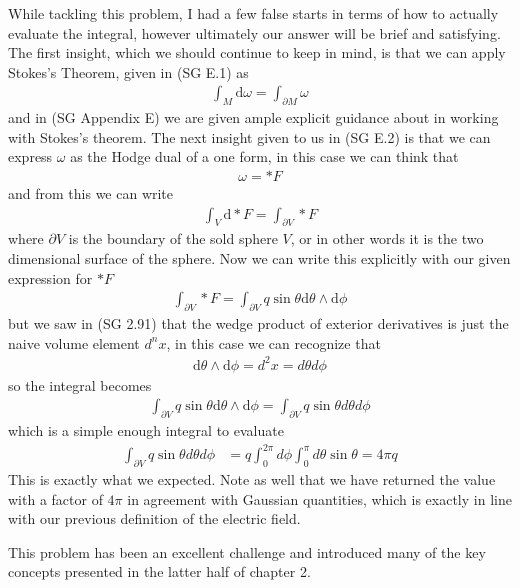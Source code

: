 While tackling this problem, I had a few false starts in terms of how to actually evaluate the integral, however ultimately our answer will be brief and satisfying. The first insight, which we should continue to keep in mind, is that we can apply Stokes's Theorem, given in (SG E.1) as 
%
\begin{align}
	\int_M \textrm{d} \omega = \int_{\partial M} \omega 
\end{align}
%
and in (SG Appendix E) we are given ample explicit guidance about in working with Stokes's theorem. The next insight given to us in (SG E.2) is that we can express $\omega$ as the Hodge dual of a one form, in this case we can think that
%
\begin{align}
	\omega = \ast F 
\end{align}
%
and from this we can write 
%
\begin{align}
	\int_V \textrm{d} \ast F = \int_{\partial V} \ast F
\end{align}
%
where $ \partial V $ is the boundary of the sold sphere $V$, or in other words it is the two dimensional surface of the sphere.  Now we can write this explicitly with our given expression for $ \ast F $
%
\begin{align}
	\int_{\partial V} \ast F = 	\int_{\partial V} q \sin{\theta} \textrm{d} \theta \wedge \textrm{d} \phi
\end{align}
%
but we saw in (SG 2.91) that the wedge product of exterior derivatives is just the naive volume element $d^n x$, in this case we can recognize that 
%
\begin{align}
	\textrm{d} \theta \wedge \textrm{d} \phi = d^2 x = d \theta d \phi
\end{align}
%
so the integral becomes
%
\begin{align}
	\int_{\partial V} q \sin{\theta} \textrm{d} \theta \wedge \textrm{d} \phi = \int_{\partial V} q \sin{\theta} d \theta d \phi
\end{align}
%
which is a simple enough integral to evaluate
%
\begin{align}
	\int_{\partial V} q \sin{\theta} d \theta d \phi &= q \int_{0}^{2 \pi} d \phi \int_{0}^{\pi} d \theta \sin{\theta} = 4 \pi q
\end{align}
% 
This is exactly what we expected. Note as well that we have returned the value with a factor of $4 \pi$ in agreement with Gaussian quantities, which is exactly in line with our previous definition of the electric field. 

This problem has been an excellent challenge and introduced many of the key concepts presented in the latter half of chapter 2. 
